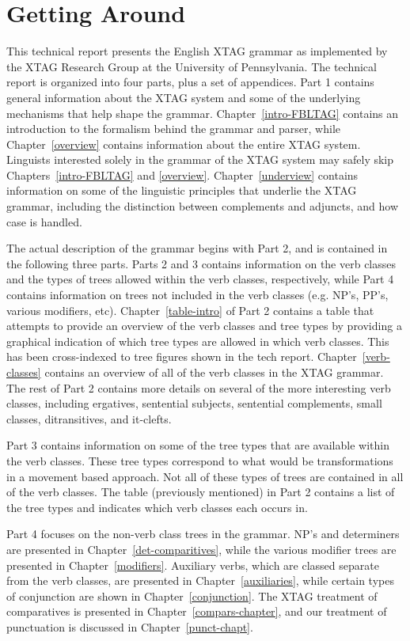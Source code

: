 \chapter{Getting Around}

This technical report presents the English XTAG grammar as implemented by the
XTAG Research Group at the University of Pennsylvania.  The technical report is
organized into four parts, plus a set of appendices.  Part 1 contains general
information about the XTAG system and some of the underlying mechanisms that
help shape the grammar.  Chapter~\ref{intro-FBLTAG} contains an introduction to
the formalism behind the grammar and parser, while Chapter~\ref{overview}
contains information about the entire XTAG system.  Linguists interested solely
in the grammar of the XTAG system may safely skip Chapters~\ref{intro-FBLTAG}
and \ref{overview}.  Chapter~\ref{underview} contains information on some of
the linguistic principles that underlie the XTAG grammar, including the
distinction between complements and adjuncts, and how case is handled.

The actual description of the grammar begins with Part 2, and is contained in
the following three parts.  Parts 2 and 3 contains information on the verb
classes and the types of trees allowed within the verb classes, respectively,
while Part 4 contains information on trees not included in the verb classes
(e.g.  NP's, PP's, various modifiers, etc).  Chapter~\ref{table-intro} of Part
2 contains a table that attempts to provide an overview of the verb classes and
tree types by providing a graphical indication of which tree types are allowed
in which verb classes.  This has been cross-indexed to tree figures shown in
the tech report.  Chapter~\ref{verb-classes} contains an overview of all of the
verb classes in the XTAG grammar.  The rest of Part 2 contains more details on
several of the more interesting verb classes, including ergatives, sentential
subjects, sentential complements, small classes, ditransitives, and it-clefts.

Part 3 contains information on some of the tree types that are available within
the verb classes.  These tree types correspond to what would be transformations
in a movement based approach.  Not all of these types of trees are contained in
all of the verb classes.  The table (previously mentioned) in Part 2 contains a
list of the tree types and indicates which verb classes each occurs in.  

Part 4 focuses on the non-verb class trees in the grammar.  NP's and
determiners are presented in Chapter~\ref{det-comparitives}, while the various
modifier trees are presented in Chapter~\ref{modifiers}.  Auxiliary verbs,
which are classed separate from the verb classes, are presented in
Chapter~\ref{auxiliaries}, while certain types of conjunction are shown in
Chapter~\ref{conjunction}.  The XTAG treatment of comparatives is
presented in Chapter~\ref{compars-chapter}, and our treatment of
punctuation is discussed in Chapter~\ref{punct-chapt}.

